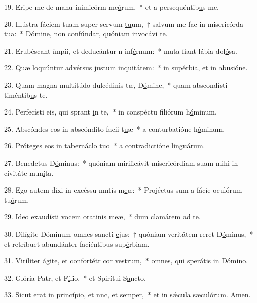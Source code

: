 19. Eripe me de manu inimicórm me\uline{ó}rum,~* et a persequéntib\uline{u}s me.\par 
20. Illústra fáciem tuam super servum \uline{tu}um,~† salvum me fac in misericórda t\uline{u}a:~* Dómine, non confúndar, quóniam invoc\uline{á}vi te.\par 
21. Erubéscant ímpii, et deducántur n inf\uline{é}rnum:~* muta fiant lábia dol\uline{ó}sa.\par 
22. Quæ loquúntur advérsus justum inquit\uline{á}tem:~* in supérbia, et in abusi\uline{ó}ne.\par 
23. Quam magna multitúdo dulcédinis tæ, D\uline{ó}mine,~* quam abscondísti timéntib\uline{u}s te.\par 
24. Perfecísti eis, qui sprant \uline{i}n te,~* in conspéctu filiórum h\uline{ó}minum.\par 
25. Abscóndes eos in abscóndito facii t\uline{u}æ~* a conturbatióne h\uline{ó}minum.\par 
26. Próteges eos in tabernáclo t\uline{u}o~* a contradictióne lin\uline{guá}rum.\par 
27. Benedctus D\uline{ó}minus:~* quóniam mirificávit misericórdiam suam mihi in civitáte mun\uline{í}ta.\par 
28. Ego autem dixi in excéssu mntis m\uline{e}æ:~* Projéctus sum a fácie oculórum tu\uline{ó}rum.\par 
29. Ideo exaudísti vocem oratinis m\uline{e}æ,~* dum clamárem \uline{a}d te.\par 
30. Dilígite Dóminum omnes sancti \uline{e}jus:~† quóniam veritátem reret D\uline{ó}minus,~* et retríbuet abundánter faciéntibus sup\uline{é}rbiam.\par 
31. Viríliter ágite, et confortétr cor v\uline{e}strum,~* omnes, qui sperátis in D\uline{ó}mino.\par 
32. Glória Patr, et F\uline{í}lio,~* et Spirítui S\uline{a}ncto.\par 
33. Sicut erat in princípio, et nnc, et s\uline{e}mper,~* et in sǽcula sæculórum. \uline{A}men.\par 
